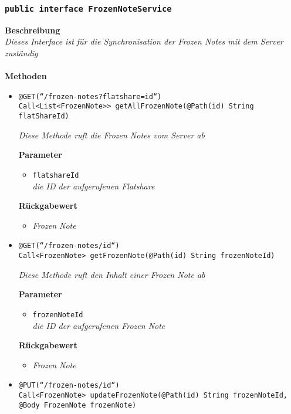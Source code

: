 	\subsubsection{\texttt{public interface FrozenNoteService }}
	\textbf{Beschreibung}\\
	\textit{Dieses Interface ist für die Synchronisation der Frozen Notes mit dem Server zuständig}\\
\\
	\textbf{Methoden} 
		\begin{itemize}
		\item\texttt{{@GET(``/frozen-notes?flatshare={id}``)\\
Call<List<FrozenNote>{}> getAllFrozenNote(@Path(\grqq id\grqq) String flatShareId)}}

		\textit{Diese Methode ruft die Frozen Notes vom Server ab}

		\textbf{Parameter} 
			\begin{itemize}
				\item\texttt{flatshareId}\\
		 		\textit{die ID der aufgerufenen Flatshare}
	 		\end{itemize}

		\textbf{Rückgabewert} 
		\begin{itemize}
		\item\textit{Frozen Note}
		\end{itemize}
		
		
      \item\texttt{{@GET(``/frozen-notes/{id}``)\\ Call<FrozenNote> getFrozenNote(@Path(\grqq id\grqq) String frozenNoteId)}}

		\textit{Diese Methode ruft den Inhalt einer Frozen Note ab }
	
		\textbf{Parameter} 
			\begin{itemize}
				\item\texttt{frozenNoteId}\\
		 		\textit{die ID der aufgerufenen Frozen Note }
	 		\end{itemize}

		\textbf{Rückgabewert} 
		\begin{itemize}
		\item\textit{Frozen Note}
		\end{itemize}

	 \item\texttt{{@PUT(``/frozen-notes/{id}``)\\ Call<FrozenNote> updateFrozenNote(@Path(\grqq id\grqq) String frozenNoteId, @Body FrozenNote frozenNote)}}


\end{itemize}
